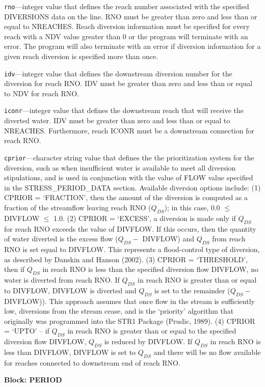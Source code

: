 \begin{description}
\item \texttt{rno}---integer value that defines the reach number associated with the specified DIVERSIONS data on the line. RNO must be greater than zero and less than or equal to NREACHES.  Reach diversion information must be specified for every reach with a NDV value greater than 0 or the program will terminate with an error.  The program will also terminate with an error if diversion information for a given reach diversion is specified more than once.

\item \texttt{idv}---integer value that defines the downstream diversion number for the diversion for reach RNO. IDV must be greater than zero and less than or equal to NDV for reach RNO.

\item \texttt{iconr}---integer value that defines the downstream reach that will receive the diverted water. IDV must be greater than zero and less than or equal to NREACHES. Furthermore, reach  ICONR must be a downstream connection for reach RNO.

\item \texttt{cprior}---character string value that defines the the prioritization system for the diversion, such as when insufficient water is available to meet all diversion stipulations, and is used in conjunction with the value of FLOW value specified in the STRESS\_PERIOD\_DATA section. Available diversion options include:  (1) CPRIOR = `FRACTION', then the amount of the diversion is computed as a fraction of the streamflow leaving reach RNO ($Q_{DS}$); in this case, 0.0 $\le$ DIVFLOW $\le$ 1.0.  (2) CPRIOR = `EXCESS', a diversion is made only if $Q_{DS}$ for reach RNO exceeds the value of DIVFLOW. If this occurs, then the quantity of water diverted is the excess flow ($Q_{DS} -$ DIVFLOW) and $Q_{DS}$ from reach RNO is set equal to DIVFLOW. This represents a flood-control type of diversion, as described by Danskin and Hanson (2002). (3) CPRIOR = `THRESHOLD', then if $Q_{DS}$ in reach RNO is less than the specified diversion flow DIVFLOW, no water is diverted from reach RNO. If $Q_{DS}$ in reach RNO is greater than or equal to DIVFLOW, DIVFLOW is diverted and $Q_{DS}$ is set to the remainder ($Q_{DS} -$ DIVFLOW)). This approach assumes that once flow in the stream is sufficiently low, diversions from the stream cease, and is the `priority' algorithm that originally was programmed into the STR1 Package (Prudic, 1989).  (4) CPRIOR = `UPTO' -- if $Q_{DS}$ in reach RNO is greater than or equal to the specified diversion flow DIVFLOW, $Q_{DS}$ is reduced by DIVFLOW. If $Q_{DS}$ in reach RNO is less than DIVFLOW, DIVFLOW is set to $Q_{DS}$ and there will be no flow available for reaches connected to downstream end of reach RNO.

\end{description}
\item \textbf{Block: PERIOD}

